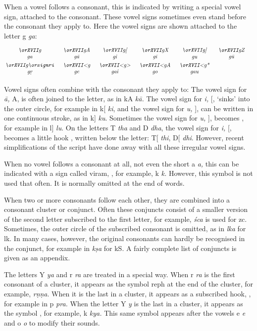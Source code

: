 When a vowel follows a consonant, this is indicated by writing a special vowel sign,
attached to the consonant. These vowel signs sometimes even stand before the
consonant they apply to. Here the vowel signs are shown attached to the letter 
{\or g} {\it ga\/}:

$$
\vbox{\halign{\it\hfill#\hfill\quad&&\it\hfill#\hfill\quad\cr
\OB{g}{ga}	&\OB{gA}{g\=a}	&\OB{g[}{gi}	&\OB{gX}{g\=\i} &\OB{g]}{gu}	&\OB{gZ}{g\=u}	\cr\noalign{\smallskip}
\OB{g\orsignri}{g\d r}	&\OB{<g}{ge}	&\OB{<g>}{gai}	&\OB{<gA}{go} &\OB{<g*}{gau}	\cr\noalign{\smallskip}
}}
$$

Vowel signs often combine with the consonant they apply to:
The vowel sign for {\it\=a,} {\or\dotcircle A}, is often joined to the letter, as
in {\or kA} {\it k\=a.}
The vowel sign for {\it i,} {\or\dotcircle[}, `sinks' into the outer circle,
for example in 
{\or k[} {\it ki}, and the vowel sign for {\it u,} {\or\dotcircle]}, can be written
in one continuous stroke, as in {\or k]} {\it ku}. Sometimes
the vowel sign for {\it u,} {\or\dotcircle]}, becomes {\or\dotcircle\orsignuvar},
for example in {\or l]} {\it lu}.
On the letters  
{\or T} {\it tha\/} and {\or D} {\it dha}, the vowel sign for {\it i,}
{\or\dotcircle[}, becomes a little hook {\or\dotcircle\orsignivar}, written
below the letter: {\or T[} {\it thi}, {\or D[} {\it dhi}. However, recent
simplifications
of the script have done away with all these irregular vowel signs.

When no vowel follows a consonant at all, not even the short {\or a} {\it a,}
this can be indicated with
a sign called viram, {\or\dotcircle\orhalant}, for example, {\or k\orhalant} {\it k.}
However, this symbol is not
used that often. It is normally omitted at the end of words.

When two or more consonants follow each other, they are combined into a
consonant cluster or conjunct.
Often these conjuncts consist of a smaller version of the second letter subscribed
to the first letter, for example, {\or\orshca} {\it \'sca\/}
is used for {\or z\orhalant c}. Sometimes,
the outer circle of the subscribed consonant is omitted, as in {\or\orlka} {\it lka\/}
for {\or l\orhalant k}. In many cases, however, the original consonants can hardly
be recognised in the conjunct, for example in {\or\orkSa} {\it k\d sa\/}
for {\or k\orhalant S}. A fairly complete list of conjuncts is given as an appendix.

The letters {\or Y} {\it ya} and {\or r} {\it ra\/} are treated in a special way. 
When {\or r} {\it ra\/} is the first consonant of a cluster, it appears as the symbol
reph {\or\dotcircle\orreph} at
the end of the cluster, for example, {\or\orNNa\orreph} {\it r\d n\d na}. When it
is the last in a cluster, it appears as a subscribed hook, {\or\dotcircle\orsecra}, for
example in {\or p\orsecra} {\it pra.} When the letter {\or Y} {\it y\/} is the
last in a cluster,
it appears as the symbol {\or\dotcircle\orsecya}, for example, {\or k\orsecya} {\it
kya.} This same symbol {\or\dotcircle\orsecya} appears after the vowels {\or e} 
{\it e\/} and {\or o} {\it o\/} to modify their sounds.

